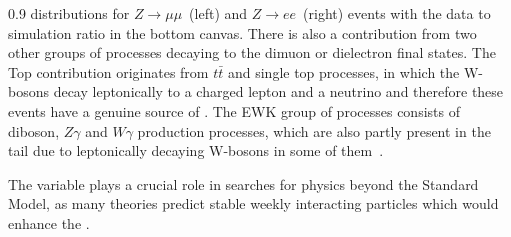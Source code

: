                  {0.9}       %
                 { \MET distributions for $Z \rightarrow \mu \mu$~(left) and $Z \rightarrow ee$~(right) events with the data to simulation ratio in the bottom canvas. There is also a contribution from two other groups of processes decaying to the dimuon or dielectron final states. The Top contribution originates from $t\bar{t}$ and single top processes, in which the W-bosons decay leptonically to a charged lepton and a neutrino and therefore these events have a genuine source of \MET. The EWK group of processes consists of diboson, $Z\gamma$ and $W\gamma$ production processes, which are also partly present in the \MET tail due to leptonically decaying W-bosons in some of them~\cite{CMS:2016ljj}. }

The \MET variable plays a crucial role in searches for physics beyond the Standard Model, as many theories predict stable weekly interacting particles which would enhance the \MET.



